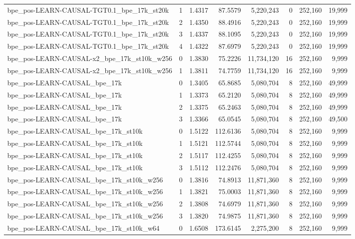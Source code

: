 \begin{tabular}{lrrrrrrr}
bpe\_pos-LEARN-CAUSAL-TGT0.1\_bpe\_17k\_st20k & 1 & 1.4317 & 87.5579 & 5,220,243 & 0 & 252,160 & 19,999 \\
bpe\_pos-LEARN-CAUSAL-TGT0.1\_bpe\_17k\_st20k & 2 & 1.4350 & 88.4916 & 5,220,243 & 0 & 252,160 & 19,999 \\
bpe\_pos-LEARN-CAUSAL-TGT0.1\_bpe\_17k\_st20k & 3 & 1.4337 & 88.1095 & 5,220,243 & 0 & 252,160 & 19,999 \\
bpe\_pos-LEARN-CAUSAL-TGT0.1\_bpe\_17k\_st20k & 4 & 1.4322 & 87.6979 & 5,220,243 & 0 & 252,160 & 19,999 \\
bpe\_pos-LEARN-CAUSAL-x2\_bpe\_17k\_st10k\_w256 & 0 & 1.3830 & 75.2226 & 11,734,120 & 16 & 252,160 & 9,999 \\
bpe\_pos-LEARN-CAUSAL-x2\_bpe\_17k\_st10k\_w256 & 1 & 1.3811 & 74.7759 & 11,734,120 & 16 & 252,160 & 9,999 \\
bpe\_pos-LEARN-CAUSAL\_bpe\_17k & 0 & 1.3405 & 65.8685 & 5,080,704 & 8 & 252,160 & 49,999 \\
bpe\_pos-LEARN-CAUSAL\_bpe\_17k & 1 & 1.3373 & 65.2120 & 5,080,704 & 8 & 252,160 & 49,999 \\
bpe\_pos-LEARN-CAUSAL\_bpe\_17k & 2 & 1.3375 & 65.2463 & 5,080,704 & 8 & 252,160 & 49,999 \\
bpe\_pos-LEARN-CAUSAL\_bpe\_17k & 3 & 1.3366 & 65.0545 & 5,080,704 & 8 & 252,160 & 49,500 \\
bpe\_pos-LEARN-CAUSAL\_bpe\_17k\_st10k & 0 & 1.5122 & 112.6136 & 5,080,704 & 8 & 252,160 & 9,999 \\
bpe\_pos-LEARN-CAUSAL\_bpe\_17k\_st10k & 1 & 1.5121 & 112.5744 & 5,080,704 & 8 & 252,160 & 9,999 \\
bpe\_pos-LEARN-CAUSAL\_bpe\_17k\_st10k & 2 & 1.5117 & 112.4255 & 5,080,704 & 8 & 252,160 & 9,999 \\
bpe\_pos-LEARN-CAUSAL\_bpe\_17k\_st10k & 3 & 1.5112 & 112.2476 & 5,080,704 & 8 & 252,160 & 9,999 \\
bpe\_pos-LEARN-CAUSAL\_bpe\_17k\_st10k\_w256 & 0 & 1.3816 & 74.8913 & 11,871,360 & 8 & 252,160 & 9,999 \\
bpe\_pos-LEARN-CAUSAL\_bpe\_17k\_st10k\_w256 & 1 & 1.3821 & 75.0003 & 11,871,360 & 8 & 252,160 & 9,999 \\
bpe\_pos-LEARN-CAUSAL\_bpe\_17k\_st10k\_w256 & 2 & 1.3808 & 74.6979 & 11,871,360 & 8 & 252,160 & 9,999 \\
bpe\_pos-LEARN-CAUSAL\_bpe\_17k\_st10k\_w256 & 3 & 1.3820 & 74.9875 & 11,871,360 & 8 & 252,160 & 9,999 \\
bpe\_pos-LEARN-CAUSAL\_bpe\_17k\_st10k\_w64 & 0 & 1.6508 & 173.6145 & 2,275,200 & 8 & 252,160 & 9,999 \\

\end{tabular}
